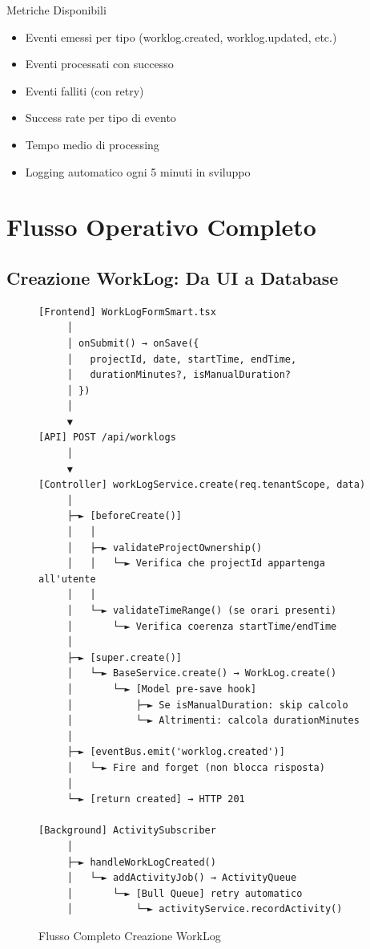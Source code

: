 \documentclass[11pt,a4paper]{article}
\begin{document}
\begin{tipbox}{Metriche Disponibili}
\begin{itemize}
    \item Eventi emessi per tipo (worklog.created, worklog.updated, etc.)
    \item Eventi processati con successo
    \item Eventi falliti (con retry)
    \item Success rate per tipo di evento
    \item Tempo medio di processing
    \item Logging automatico ogni 5 minuti in sviluppo
\end{itemize}
\end{tipbox}

\section{Flusso Operativo Completo}

\subsection{Creazione WorkLog: Da UI a Database}

\begin{figure}[H]
\centering
\begin{lstlisting}[caption=Flusso Creazione WorkLog]
[Frontend] WorkLogFormSmart.tsx
     │
     │ onSubmit() → onSave({ 
     │   projectId, date, startTime, endTime,
     │   durationMinutes?, isManualDuration?
     │ })
     │
     ▼
[API] POST /api/worklogs
     │
     ▼
[Controller] workLogService.create(req.tenantScope, data)
     │
     ├─► [beforeCreate()]
     │   │
     │   ├─► validateProjectOwnership()
     │   │   └─► Verifica che projectId appartenga all'utente
     │   │
     │   └─► validateTimeRange() (se orari presenti)
     │       └─► Verifica coerenza startTime/endTime
     │
     ├─► [super.create()]
     │   └─► BaseService.create() → WorkLog.create()
     │       └─► [Model pre-save hook]
     │           ├─► Se isManualDuration: skip calcolo
     │           └─► Altrimenti: calcola durationMinutes
     │
     ├─► [eventBus.emit('worklog.created')]
     │   └─► Fire and forget (non blocca risposta)
     │
     └─► [return created] → HTTP 201
     
[Background] ActivitySubscriber
     │
     ├─► handleWorkLogCreated()
     │   └─► addActivityJob() → ActivityQueue
     │       └─► [Bull Queue] retry automatico
     │           └─► activityService.recordActivity()
\end{lstlisting}
\caption{Flusso Completo Creazione WorkLog}
\end{figure}
\end{document}

